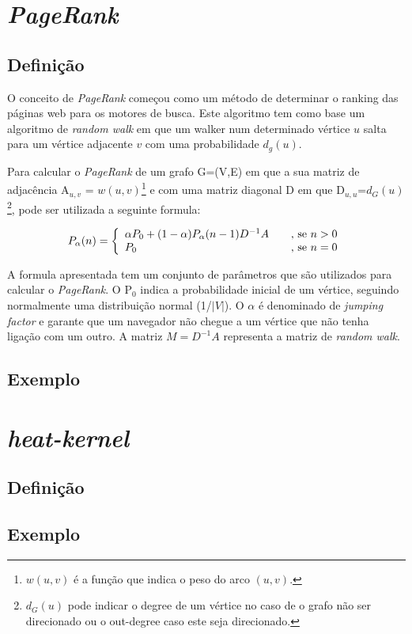 \documentclass[a4paper,10pt]{article}
\begin{document}
\section*{\textit{PageRank}}

  \subsection*{Definição}

  O conceito de \textit{PageRank} começou como um método de determinar o ranking das páginas web para os motores de busca. 
  Este algoritmo tem como base um algoritmo de \textit{random walk} em que um walker num determinado vértice $u$ salta para um vértice adjacente $v$ com uma probabilidade $d_g(u)$.
  
  Para calcular o \textit{PageRank} de um grafo G=(V,E) em que a sua matriz de adjacência A$_{u,v}$ = $w(u,v)$\footnote{$w(u,v)$ é a função que indica o peso do arco $(u,v)$.} e com uma matriz diagonal D em que D$_{u,u}$=$d_G(u)$\footnote{$d_G(u)$ pode indicar o degree de um vértice no caso de o grafo não ser direcionado ou o out-degree caso este seja direcionado.}, pode ser utilizada a seguinte formula:
  
\[ P_\alpha(n) = \left\{
  \begin{array}{l l}
    \alpha P_0+(1-\alpha)P_\alpha(n-1)D^{{-}1}A & \quad \text{, se } n>0   \\
    P_0 & \quad \text{, se }n=0 
  \end{array} \right.\]
  
  A formula apresentada tem um conjunto de parâmetros que são utilizados para calcular o \textit{PageRank}. O P$_0$ indica a probabilidade inicial de um vértice, seguindo normalmente uma distribuição normal (1/$|V|$). O $\alpha$ é denominado de \textit{jumping factor} e garante que um navegador não chegue a um vértice que não tenha ligação com um outro. A matriz $M=D^{{-}1}A$ representa a matriz de \textit{random walk}.
  
  \subsection*{Exemplo}
  
\section*{\textit{heat-kernel}}

  \subsection*{Definição}
  
    
  
  \subsection*{Exemplo}
\end{document}
